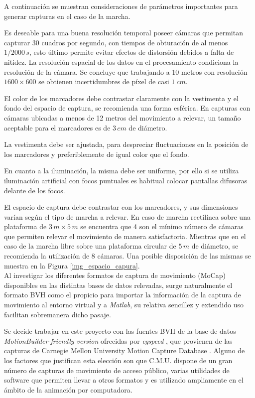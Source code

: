 A continuación se muestran consideraciones de parámetros importantes para generar capturas en el caso de la marcha.

Es deseable para una buena resolución temporal poseer cámaras que permitan capturar 30 cuadros por segundo, con tiempos de obturación de al menos $1/2000\, s$, esto último permite evitar efectos de distorsión debidos a falta de nitidez. La resolución espacial de los datos en el procesamiento condiciona la resolución de la cámara. Se concluye que trabajando a 10 metros con resolución $1600\times600$ se obtienen incertidumbres de píxel de casi $1 ~cm $. 


El color de los  marcadores debe contrastar claramente con la vestimenta y el fondo del espacio de captura, se recomienda una forma esférica. En capturas con cámaras ubicadas a menos de 12 metros del movimiento a relevar, un tamaño aceptable para el marcadores es de $3\,cm$ de diámetro.

La vestimenta debe ser ajustada, para despreciar fluctuaciones en la posición de los marcadores y preferiblemente de igual color que el fondo.  

En cuanto a la iluminación, la misma debe ser uniforme, por ello si se utiliza iluminación artificial con focos puntuales es habitual colocar pantallas difusoras delante de los focos.

El espacio de captura debe contrastar con los marcadores, y sus dimensiones varían según el tipo de marcha a relevar. En caso de marcha rectilínea sobre una plataforma de $3\,m \times 5 \,m$ se encuentra que 4 son el mínimo número de cámaras que permiten relevar el movimiento de manera satisfactoria. Mientras  que en el caso de la marcha libre sobre una plataforma circular de $5\,m$ de diámetro, se recomienda la utilización de 8 cámaras. Una posible disposición de las mismas se muestra en la Figura \ref{img_espacio_capura}. \\

Al investigar los diferentes formatos de captura de movimiento (MoCap) disponibles en las distintas bases de datos relevadas, surge naturalmente el formato BVH como el propicio para importar la información de la captura de movimiento al entorno virtual y a \textit{Matlab}, su relativa sencillez y extendido uso facilitan sobremanera dicho pasaje. 

Se decide trabajar en este proyecto con las fuentes BVH de la base de datos \textit{MotionBuilder-friendly version} ofrecidas por \textit{cgspeed} \cite{cgspeed}, 
 que provienen de las capturas de Carnegie Mellon University Motion Capture Database \cite{CMU}.
 Alguno de los factores que justifican esta elección son que C.M.U. dispone de un gran número de capturas de movimiento de acceso público, varias utilidades de software que permiten llevar a otros formatos y es utilizado ampliamente en el ámbito de la animación por computadora.
 
